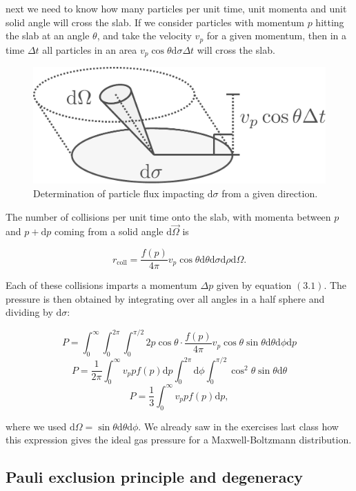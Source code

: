 \documentclass[twocolumn]{article}
\begin{document}
next we need to know how many particles per unit time, unit momenta and
unit solid angle will cross the slab. If we consider particles with
momentum \(p\) hitting the slab at an angle \(\theta\), and take the
velocity \(v_p\) for a given momentum, then in a time \(\Delta t\) all
particles in an area \(v_p\cos\theta\mathrm{d}\sigma\Delta t\) will
cross the slab.

\begin{figure}
\centering
\includegraphics{../assets/4_eos2/pressure3.pdf}
\caption{Determination of particle flux impacting \(\mathrm{d}\sigma\)
from a given direction.}
\end{figure}

The number of collisions per unit time onto the slab, with momenta
between \(p\) and \(p+\mathrm{d}p\) coming from a solid angle
\(\mathrm{d}\vec{\Omega}\) is

\[r_\mathrm{coll}=\frac{f(p)}{4\pi}v_p\cos\theta\mathrm{d}\theta\mathrm{d}\sigma\mathrm{d}\rho\mathrm{d}\Omega.\]

Each of these collisions imparts a momentum \(\Delta p\) given by
equation \((3.1)\). The pressure is then obtained by integrating over
all angles in a half sphere and dividing by \(\mathrm{d}\sigma\):

\[P=\int_0^{\infty}\int_0^{2\pi}\int_0^{\pi/2} 2p\cos\theta \cdot \frac{f(p)}{4\pi}v_p\cos\theta \sin\theta \mathrm{d}\theta\mathrm{d}\phi\mathrm{d}p\]
\[P=\frac{1}{2\pi}\int_0^\infty v_p p f(p)\mathrm{d}p \int_0^{2\pi}\mathrm{d}\phi \int_0^{\pi/2}\cos^2\theta\sin\theta \mathrm{d}\theta\]
\[\boxed{P=\frac{1}{3}\int_0^\infty v_p p f(p)\mathrm{d}p,}\tag{3.2}\]

where we used
\(\mathrm{d}\Omega=\sin\theta\mathrm{d}\theta\mathrm{d}\phi\). We
already saw in the exercises last class how this expression gives the
ideal gas pressure for a Maxwell-Boltzmann distribution.

\hypertarget{pauli-exclusion-principle-and-degeneracy}{%
\subsection{Pauli exclusion principle and
degeneracy}\label{pauli-exclusion-principle-and-degeneracy}}
\end{document}
